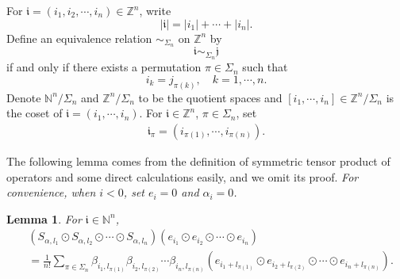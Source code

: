 \documentclass[11pt]{article}
\theoremstyle{plain}
\newtheorem{lem}[thm]{Lemma}
\theoremstyle{definition}
\begin{document}
For $\mathfrak{i}=(i_1,i_2,\cdots, i_n)\in\mathbb Z^n$, write $$|\mathfrak{i}|=|i_1|+\cdots+|i_n|.$$ Define an equivalence relation $\sim_{\Sigma_n}$ on $\mathbb Z^n$ by 
$$\mathfrak{i}\sim_{\Sigma_n}\mathfrak{j}$$ if and only if there exists a permutation $\pi\in\Sigma_n$ such that 
$$
i_k=j_{\pi (k)}, \quad k=1,\cdots, n.
$$
Denote $\mathbb N^n/\Sigma_n$ and $\mathbb Z^n/\Sigma_n$ to be the quotient spaces and $[i_1,\cdots,i_n] \in \mathbb Z^n/\Sigma_n $  is the coset of $\mathfrak{i}=(i_1,\cdots,i_n)$.   For $\mathfrak{i}\in\mathbb Z^n$, $\pi\in\Sigma_n$, set 
\begin{eqnarray}
\mathfrak{i}_\pi=(i_{\pi(1)},\cdots,i_{\pi(n)}).
\end{eqnarray}

 The following lemma comes from the definition of symmetric tensor product of operators and some  direct calculations easily, and we omit its proof. {\it For convenience, when $i<0$, set $e_i=0$ and $\alpha_i=0$.}
\begin{lem}\label{lem2.1}
	For $\mathfrak{i}\in\mathbb N^n$,
	$$\begin{aligned}
		& \left ( S_{\alpha,{l_{1}}}\odot S_{\alpha,{l_{2}}}\odot \cdots \odot S_{\alpha,{l_{n}}}  \right ) \left ( e_{i_{1} }\odot e_{i_{2} }\odot \cdots \odot e_{i_{n}}    \right )
		\\ &=\frac{1}{n!} \sum\limits_{\pi  \in \Sigma _{n} }\beta_{i_{1},l_{\pi  (1)}} \beta_{i_{2},l_{\pi  (2)}}\cdots\beta_{i_{n},l_{\pi  (n)}} \left (  e_{i_{1}+l_{\pi  (1)} }\odot e_{i_{2}+l_{\pi  (2)} }\odot \cdots \odot e_{i_{n} +l_{\pi  (n)}} \right ).
	\end{aligned}$$	
\end{lem}
\end{document}
